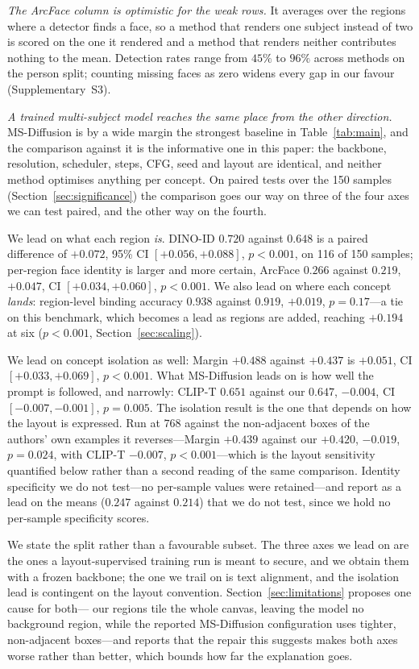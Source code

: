 \documentclass[review,10pt,times]{elsarticle}
\begin{document}
\noindent\textit{The ArcFace column is optimistic for the weak
rows.}
It averages over the regions where a detector finds a face, so a method that
renders one subject instead of two is scored on the one it rendered and a
method that renders neither contributes nothing to the mean.  Detection rates
range from $45\%$ to $96\%$ across methods on the person split; counting
missing faces as zero widens every gap in our favour
(Supplementary~S3).


\noindent\textit{A trained multi-subject model reaches the same place from
the other direction.}
MS-Diffusion is by a wide margin the strongest baseline in
Table~\ref{tab:main}, and the comparison against it is the informative one
in this paper: the backbone, resolution, scheduler, steps, CFG, seed and
layout are identical, and neither method optimises anything per concept.  On
paired tests over the 150 samples (Section~\ref{sec:significance}) the
comparison goes our way on three of the four axes we can test paired, and
the other way on the fourth.

We lead on what each region \emph{is}.  DINO-ID $0.720$ against $0.648$ is a
paired difference of $+0.072$, 95\% CI $[+0.056,+0.088]$, $p{<}0.001$, on 116
of 150 samples; per-region face identity is larger and more certain, ArcFace
$0.266$ against $0.219$, $+0.047$, CI $[+0.034,+0.060]$, $p{<}0.001$.  We
also lead on where each concept \emph{lands}: region-level binding accuracy
$0.938$ against $0.919$, $+0.019$, $p{=}0.17$---a tie on this benchmark,
which becomes a lead as regions are added, reaching $+0.194$ at six
($p{<}0.001$, Section~\ref{sec:scaling}).

We lead on concept isolation as well: Margin $+0.488$ against $+0.437$ is
$+0.051$, CI $[+0.033,+0.069]$, $p{<}0.001$.  What MS-Diffusion leads on is
how well the prompt is followed, and narrowly: CLIP-T $0.651$ against our
$0.647$, $-0.004$, CI $[-0.007,-0.001]$, $p{=}0.005$.  The isolation result
is the one that depends on how the layout is expressed.  Run at $768$ against
the non-adjacent boxes of the authors' own examples it reverses---Margin
$+0.439$ against our $+0.420$, $-0.019$, $p{=}0.024$, with CLIP-T $-0.007$,
$p{<}0.001$---which is the layout sensitivity quantified below rather than a
second reading of the same comparison.  Identity specificity we do not test---no per-sample values were
retained---and report as a lead on the means ($0.247$ against $0.214$) that
we do not test, since we hold no per-sample specificity scores.

We state the split rather than a favourable subset.  The three axes we lead
on are the ones a layout-supervised training run is meant to secure, and we
obtain them with a frozen backbone; the one we trail on is text alignment,
and the isolation lead is contingent on the layout convention.
Section~\ref{sec:limitations} proposes one cause for both---
our regions tile the whole canvas, leaving the model no background region,
while the reported MS-Diffusion configuration uses tighter, non-adjacent
boxes---and reports that the repair this suggests makes both axes worse
rather than better, which bounds how far the explanation goes.
\end{document}
